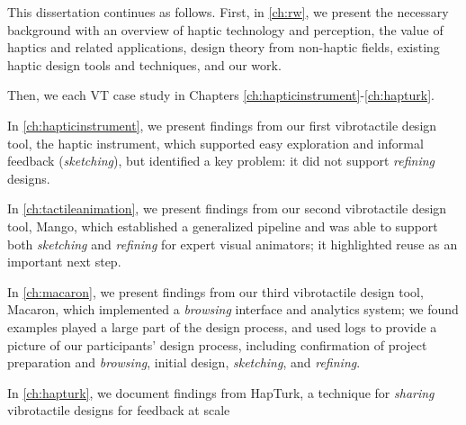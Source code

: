 

This dissertation continues as follows.
First, in \autoref{ch:rw}, we present the necessary background with an overview of haptic technology and perception, the value of haptics and related applications,  design theory from non-haptic fields,  existing haptic design tools and techniques, and  our work.

Then, we  %
each VT case study in Chapters \ref{ch:hapticinstrument}-\ref{ch:hapturk}.

In \autoref{ch:hapticinstrument}, we present findings from our first vibrotactile design tool, the haptic instrument, which supported easy exploration and informal feedback (\emph{sketching}), but identified a key problem: it did not support \emph{refining} designs.

In \autoref{ch:tactileanimation}, we present findings from our second vibrotactile design tool, Mango, which established a generalized pipeline and was able to support both \emph{sketching} and \emph{refining} for expert visual animators; it highlighted reuse as an important next step.

In \autoref{ch:macaron}, we present findings from our third vibrotactile design tool, Macaron, which implemented a \emph{browsing} interface and analytics system; we found examples played a large part of the design process, and used  %
logs to provide a picture of our participants' design process, including confirmation of project preparation and \emph{browsing}, initial design, \emph{sketching}, and \emph{refining}.

In \autoref{ch:hapturk}, we document findings from HapTurk, a technique for \emph{sharing} vibrotactile designs for feedback at scale

